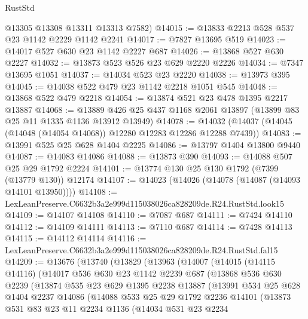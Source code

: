 \begin{lexlean}{RustStd}
\begin{coremodule}
      @13305
      @13308
      @13311
      @13313
      @7582)
@14015 := @13833 @2213 @528 @537 @23 @1142 @2229 @1142 @2241
@14017 := @7827 @13695 @519
@14023 := @14017 @527 @630 @23 @1142 @2227 @687
@14026 := @13868 @527 @630 @2227
@14032 := @13873 @523 @526 @23 @629 @2220 @2226
@14034 := @7347 @13695 @1051
@14037 := @14034 @523 @23 @2220
@14038 := @13973 @395
@14045 := @14038 @522 @479 @23 @1142 @2218 @1051 @545
@14048 := @13868 @522 @479 @2218
@14054 := @13874 @521 @23 @478 @1395 @2217 @13887
@14068 := @13889 @426 @25 @437 @1168 @2061 @13897 (@13899 @83 @25 @11 @1335 @1136 @13912 @13949)
@14078 := @14032 (@14037 (@14045 (@14048 (@14054 @14068)) @12280 @12283 @12286 @12288 @7439))
@14083 := @13991 @525 @25 @628 @1404 @2225
@14086 := @13797 @1404 @13800 @9440
@14087 := @14083 @14086
@14088 := @13873 @390
@14093 := @14088 @507 @25 @29 @1792 @2224
@14101 := @13774 @130 @25 @130 @1792 (@7399 (@13779 @130)) @12174
@14107 := @14023 (@14026 (@14078 (@14087 (@14093 @14101 @13950))))
@14108 := LexLeanPreserve.C6632b3a2e999d115038026ca828209de.R24.RustStd.look15
@14109 := @14107 @14108
@14110 := @7087 @687
@14111 := @7424 @14110
@14112 := @14109 @14111
@14113 := @7110 @687
@14114 := @7428 @14113
@14115 := @14112 @14114
@14116 := LexLeanPreserve.C6632b3a2e999d115038026ca828209de.R24.RustStd.fal15
@14209 := @13676
    (@13740
      (@13829
        (@13963
          (@14007
            (@14015
              (@14115 @14116)
              (@14017
                @536
                @630
                @23
                @1142
                @2239
                @687
                (@13868
                  @536
                  @630
                  @2239
                  (@13874
                    @535
                    @23
                    @629
                    @1395
                    @2238
                    @13887
                    (@13991
                      @534
                      @25
                      @628
                      @1404
                      @2237
                      @14086
                      (@14088
                        @533
                        @25
                        @29
                        @1792
                        @2236
                        @14101
                        (@13873
                          @531
                          @83
                          @23
                          @11
                          @2234
                          @1136
                          (@14034
                            @531
                            @23
                            @2234

\end{coremodule}
\end{lexlean}
